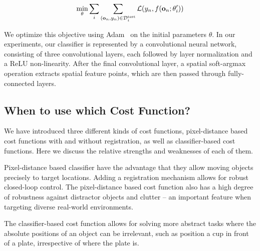 $$
\min_\theta \sum_i \sum_{(\mathbf{o}_n, y_n) \in \mathcal{D}^\text{test}_i} \mathcal{L}(y_n, f(\mathbf{o}_n; \theta_i')) 
$$

We optimize this objective using Adam~\cite{ADAM} on the initial parameters $\theta$. In our experiments, our classifier is represented by a convolutional neural network, consisting of three convolutional layers, each followed by layer normalization and a ReLU non-linearity. After the final convolutional layer, a spatial soft-argmax operation extracts spatial feature points, which are then passed through fully-connected layers.

\subsection{When to use which Cost Function?}
\label{subsec:cost_discuission}

We have introduced three different kinds of cost functions, pixel-distance based cost functions with and without registration, as well as classifier-based cost functions. Here we discuss the relative strengths and weaknesses of each of them.

Pixel-distance based classifier have the advantage that they allow moving objects precisely to target locations. Adding a registration mechanism allows for robust closed-loop control. The pixel-distance based cost function also has a high degree of robustness against distractor objects and clutter -- an important feature when targeting diverse real-world environments.

The classifier-based cost function allows for solving more abstract tasks where the absolute positions of an object can be irrelevant, such as position a cup in front of a plate, irrespective of where the plate is.
